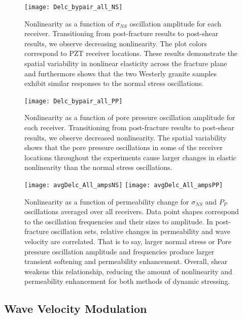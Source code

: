 \documentclass[draft]{agujournal2019}
\begin{document}
\begin{figure}[ht]
	\centering
	\texttt{[image: Delc\_bypair\_all\_NS]}
	\caption{Nonlinearity as a function of $ \sigma_{NS} $ oscillation amplitude for each receiver. Transitioning from post-fracture results to post-shear results, we observe decreasing nonlinearity. The plot colors correspond to PZT receiver locations. These results demonstrate the spatial variability in nonlinear elasticity across the fracture plane and furthermore shows that the two Westerly granite samples exhibit similar responses to the normal stress oscillations.  }
	\label{fig:delc_plots_ns}
\end{figure}

\clearpage

\begin{figure}[ht]
	\centering
	\texttt{[image: Delc\_bypair\_all\_PP]}
	\caption{Nonlinearity as a function of pore pressure oscillation amplitude for each receiver. Transitioning from post-fracture results to post-shear results, we observe decreased nonlinearity. The spatial variability shows that the pore pressure oscillations in some of the receiver locations throughout the experiments cause larger changes in elastic nonlinearity than the normal stress oscillations.}
	\label{fig:delc_plots_pp}
\end{figure}

\clearpage


\begin{figure}[ht]
	\centering
	\texttt{[image: avgDelc\_All\_ampsNS]}
	\texttt{[image: avgDelc\_All\_ampsPP]}
	\caption{Nonlinearity as a function of permeability change for $ \sigma_{NS} $ and $ P_P $ oscillations averaged over all receivers. Data point shapes correspond to the oscillation frequencies and their sizes to amplitude. In post-fracture oscillation sets, relative changes in permeability and wave velocity are correlated. That is to say, larger normal stress or Pore pressure oscillation amplitude and frequencies produce larger transient softening and permeability enhancement. Overall, shear weakens this relationship, reducing the amount of nonlinearity and permeability enhancement for both methods of dynamic stressing. }
	\label{fig:delc_plots2}
\end{figure}

\clearpage

\subsection{Wave Velocity Modulation}
\end{document}
